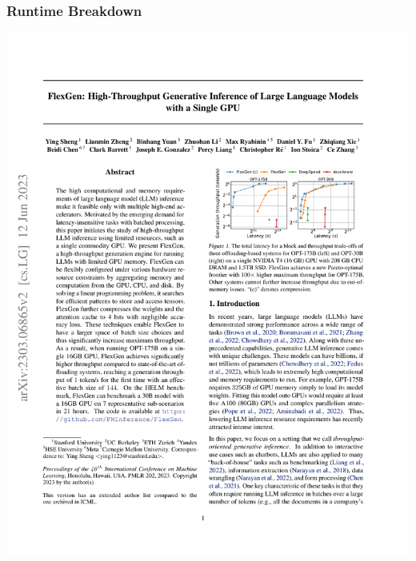 \documentclass[12pt,aspectratio=169]{beamer}
\begin{document}
    \begin{frame}
        \frametitle{Runtime Breakdown}

        \centering
        \includegraphics[page=18,trim=308.76bp 665.16bp 71.75bp 91.42bp,clip,scale=1.1]{paper.pdf}
    \end{frame}
\end{document}
